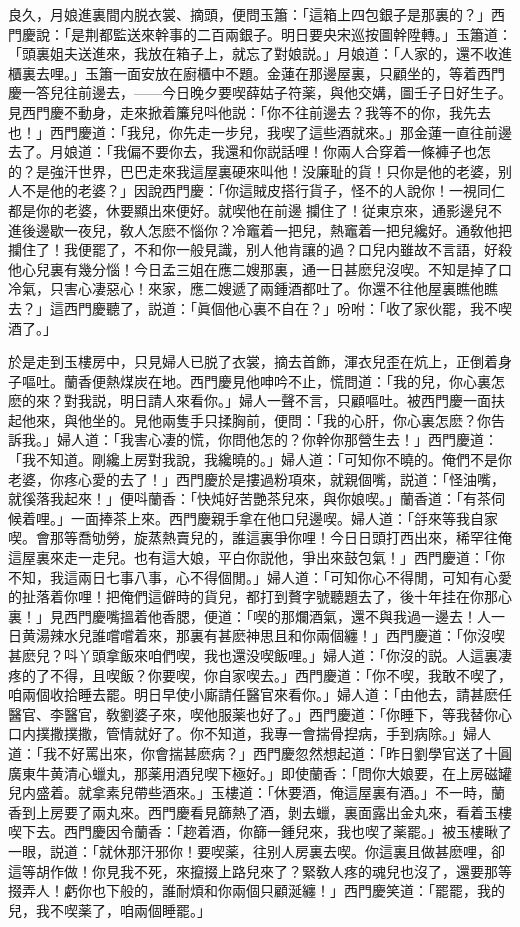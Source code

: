 良久，月娘進裏間内脱衣裳、摘頭，便問玉簫：「這箱上四包銀子是那裏的？」西門慶說：「是荆都監送來幹事的二百兩銀子。明日要央宋巡按圖幹陞轉。」玉簫道：「頭裏姐夫送進來，我放在箱子上，就忘了對娘説。」月娘道：「人家的，還不收進櫃裏去哩。」玉簫一面安放在廚櫃中不題。金蓮在那邊屋裏，只顧坐的，等着西門慶一答兒往前邊去，——今日晚夕要喫薛姑子符薬，與他交媾，圖壬子日好生子。見西門慶不動身，走來掀着簾兒呌他説：「你不往前邊去？我等不的你，我先去也！」西門慶道：「我兒，你先走一步兒，我喫了這些酒就來。」那金蓮一直往前邊去了。月娘道：「我偏不要你去，我還和你説話哩！你兩人合穿着一條褲子也怎的？是強汗世界，巴巴走來我這屋裏硬來叫他！没廉耻的貨！只你是他的老婆，别人不是他的老婆？」因說西門慶：「你這賊皮搭行貨子，怪不的人說你！一視同仁都是你的老婆，休要顯出來便好。就喫他在前邊𢺞攔住了！従東京來，通影邊兒不進後邊歇一夜兒，敎人怎麽不惱你？冷竈着一把兒，熱竈着一把兒纔好。通敎他把攔住了！我便罷了，不和你一般見識，别人他肯讓的過？口兒内雖故不言語，好殺他心兒裏有幾分惱！今日孟三姐在應二嫂那裏，通一日甚麽兒沒喫。不知是掉了口冷氣，只害心凄惡心！來家，應二嫂遞了兩鍾酒都吐了。你還不往他屋裏瞧他瞧去？」這西門慶聽了，説道：「眞個他心裏不自在？」吩咐：「收了家伙罷，我不喫酒了。」

於是走到玉樓房中，只見婦人已脱了衣裳，摘去首飾，渾衣兒歪在炕上，正倒着身子嘔吐。蘭香便熱煤炭在地。西門慶見他呻吟不止，慌問道：「我的兒，你心裏怎麽的來？對我説，明日請人來看你。」婦人一聲不言，只顧嘔吐。被西門慶一面扶起他來，與他坐的。見他兩隻手只揉胸前，便問：「我的心肝，你心裏怎麽？你告訴我。」婦人道：「我害心凄的慌，你問他怎的？你幹你那營生去！」西門慶道：「我不知道。剛纔上房對我說，我纔曉的。」婦人道：「可知你不曉的。俺們不是你老婆，你疼心愛的去了！」西門慶於是摟過粉項來，就親個嘴，説道：「怪油嘴，就徯落我起來！」便呌蘭香：「快炖好苦艷茶兒來，與你娘喫。」蘭香道：「有茶伺候着哩。」一面捧茶上來。西門慶親手拿在他口兒邊喫。婦人道：「㧱來等我自家喫。會那等喬劬勞，旋蒸熱賣兒的，誰這裏爭你哩！今日日頭打西出來，稀罕往俺這屋裏來走一走兒。也有這大娘，平白你説他，爭出來鼓包氣！」西門慶道：「你不知，我這兩日七事八事，心不得個閒。」婦人道：「可知你心不得閒，可知有心愛的扯落着你哩！把俺們這僻時的貨兒，都打到贅字號聽題去了，後十年挂在你那心裏！」見西門慶嘴搵着他香腮，便道：「喫的那爛酒氣，還不與我過一邊去！人一日黄湯辣水兒誰嚐嚐着來，那裏有甚麽神思且和你兩個纏！」西門慶道：「你沒喫甚麽兒？呌丫頭拿飯來咱們喫，我也還没喫飯哩。」婦人道：「你沒的説。人這裏凄疼的了不得，且喫飯？你要喫，你自家喫去。」西門慶道：「你不喫，我敢不喫了，咱兩個收拾睡去罷。明日早使小廝請任醫官來看你。」婦人道：「由他去，請甚麽任醫官、李醫官，敎劉婆子來，喫他服薬也好了。」西門慶道：「你睡下，等我替你心口内撲撒撲撒，管情就好了。你不知道，我專一會揣骨揑病，手到病除。」婦人道：「我不好罵出來，你會揣甚麽病？」西門慶忽然想起道：「昨日劉學官送了十圓廣東牛黄清心蠟丸，那薬用酒兒喫下極好。」即使蘭香：「問你大娘要，在上房磁罐兒内盛着。就拿素兒帶些酒來。」玉樓道：「休要酒，俺這屋裏有酒。」不一時，蘭香到上房要了兩丸來。西門慶看見篩熱了酒，剝去蠟，裏面露出金丸來，看着玉樓喫下去。西門慶因令蘭香：「趂着酒，你篩一鍾兒來，我也喫了薬罷。」被玉樓瞅了一眼，説道：「就休那汗邪你！要喫薬，往别人房裏去喫。你這裏且做甚麽哩，卻這等胡作做！你見我不死，來攛掇上路兒來了？緊敎人疼的魂兒也沒了，還要那等掇弄人！虧你也下般的，誰耐煩和你兩個只顧涎纏！」西門慶笑道：「罷罷，我的兒，我不喫薬了，咱兩個睡罷。」

